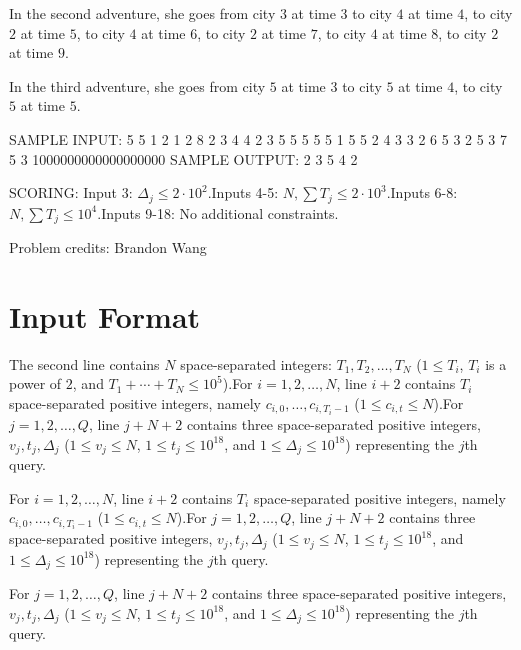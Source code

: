 \documentclass[12pt]{article}
\begin{document}
In the second adventure, she goes from city $3$ at time $3$ to city $4$ at time $4$, to city $2$ at time $5$, to city $4 $ at time $6$, to city $2$ at time $7$, to city $4$ at time $8$, to city $2$ at time $9$.

In the third adventure, she goes from city $5$ at time $3$ to city $5$ at time $4$, to city $5$ at time $5$.

SAMPLE INPUT:
5 5
1 2 1 2 8
2
3 4
4
2 3
5 5 5 5 5 1 5 5
2 4 3
3 2 6
5 3 2
5 3 7
5 3 1000000000000000000
SAMPLE OUTPUT: 
2
3
5
4
2

SCORING:
Input 3: $\Delta_j \leq 2\cdot 10^2$.Inputs 4-5: $N, \sum T_j\leq 2\cdot 10^3$.Inputs 6-8: $N, \sum T_j\leq 10^4$.Inputs 9-18: No additional constraints.


Problem credits: Brandon Wang



\section*{Input Format}
The second line contains $N$ space-separated integers: $T_1, T_2, \ldots, T_N$
($1\leq T_i$, $T_i$ is a power of $2$, and $T_1 + \cdots + T_N \leq 10^5$).For $i = 1, 2, \ldots, N$, line $i+2$ contains $T_i$ space-separated positive
integers, namely $c_{i, 0}, \ldots, c_{i, T_i-1}$ ($1\leq c_{i, t} \leq N$).For $j = 1, 2, \ldots, Q$, line $j+N+2$ contains three space-separated positive
integers, $v_j, t_j, \Delta_j$ ($1\leq v_j \leq N$, $1\leq t_j \leq 10^{18}$,
and $1\leq \Delta_j \leq 10^{18}$) representing the $j$th query.

For $i = 1, 2, \ldots, N$, line $i+2$ contains $T_i$ space-separated positive
integers, namely $c_{i, 0}, \ldots, c_{i, T_i-1}$ ($1\leq c_{i, t} \leq N$).For $j = 1, 2, \ldots, Q$, line $j+N+2$ contains three space-separated positive
integers, $v_j, t_j, \Delta_j$ ($1\leq v_j \leq N$, $1\leq t_j \leq 10^{18}$,
and $1\leq \Delta_j \leq 10^{18}$) representing the $j$th query.

For $j = 1, 2, \ldots, Q$, line $j+N+2$ contains three space-separated positive
integers, $v_j, t_j, \Delta_j$ ($1\leq v_j \leq N$, $1\leq t_j \leq 10^{18}$,
and $1\leq \Delta_j \leq 10^{18}$) representing the $j$th query.
\end{document}
